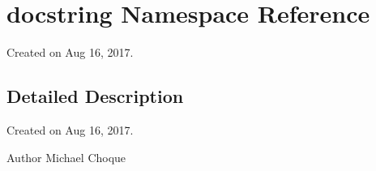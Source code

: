 \hypertarget{namespacedocstring}{}\section{docstring Namespace Reference}
\label{namespacedocstring}


Created on Aug 16, 2017.  




\subsection{Detailed Description}
Created on Aug 16, 2017. 

\begin{DoxyAuthor}{Author}
Michael Choque 
\end{DoxyAuthor}
